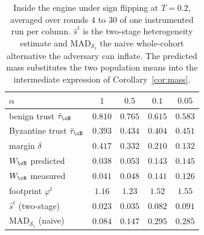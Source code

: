 \begin{table}[!t]
\centering
\caption{Inside the engine under sign flipping at $T=0.2$, averaged over rounds $4$ to $30$ of one instrumented run per column. $\hat s^t$ is the two-stage heterogeneity estimate and $\mathrm{MAD}_{\mathcal S_t}$ the naive whole-cohort alternative the adversary can inflate. The predicted mass substitutes the two population means into the intermediate expression of Corollary~\ref{cor:mass}.}
\label{tab:trust}
\setlength{\tabcolsep}{4pt}
\footnotesize
\begin{tabular}{lcccc}
\hline
$\alpha$ & $1$ & $0.5$ & $0.1$ & $0.05$\\
\hline
benign trust $\bar\tau_\cH$ & $0.810$ & $0.765$ & $0.615$ & $0.583$\\
Byzantine trust $\bar\tau_\cB$ & $0.393$ & $0.434$ & $0.404$ & $0.451$\\
margin $\delta$ & $0.417$ & $0.332$ & $0.210$ & $0.132$\\
$W_\cB$ predicted & $0.038$ & $0.053$ & $0.143$ & $0.145$\\
$W_\cB$ measured & $0.041$ & $0.048$ & $0.141$ & $0.126$\\
footprint $\varphi^t$ & $1.16$ & $1.23$ & $1.52$ & $1.55$\\
$\hat s^t$ (two-stage) & $0.023$ & $0.035$ & $0.082$ & $0.091$\\
$\mathrm{MAD}_{\mathcal S_t}$ (naive) & $0.084$ & $0.147$ & $0.295$ & $0.285$\\
\hline
\end{tabular}
\end{table}
